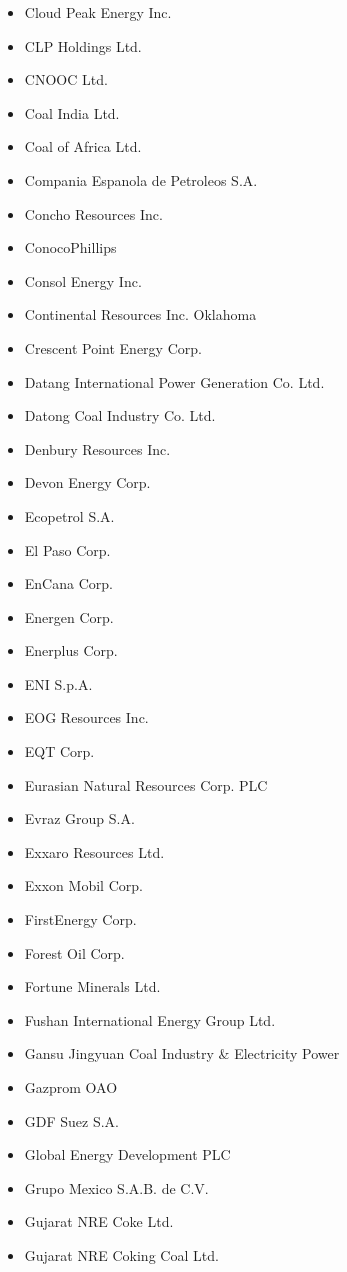 \documentclass[10pt]{article}
\begin{document}
\begin{itemize}
  \item Cloud Peak Energy Inc.
  \item CLP Holdings Ltd.
  \item CNOOC Ltd.
  \item Coal India Ltd.
  \item Coal of Africa Ltd.
  \item Compania Espanola de Petroleos S.A.
  \item Concho Resources Inc.
  \item ConocoPhillips
  \item Consol Energy Inc.
  \item Continental Resources Inc. Oklahoma
  \item Crescent Point Energy Corp.
  \item Datang International Power Generation Co. Ltd.
  \item Datong Coal Industry Co. Ltd.
  \item Denbury Resources Inc.
  \item Devon Energy Corp.
  \item Ecopetrol S.A.
  \item El Paso Corp.
  \item EnCana Corp.
  \item Energen Corp.
  \item Enerplus Corp.
  \item ENI S.p.A.
  \item EOG Resources Inc.
  \item EQT Corp.
  \item Eurasian Natural Resources Corp. PLC
  \item Evraz Group S.A.
  \item Exxaro Resources Ltd.
  \item Exxon Mobil Corp.
  \item FirstEnergy Corp.
  \item Forest Oil Corp.
  \item Fortune Minerals Ltd.
  \item Fushan International Energy Group Ltd.
  \item Gansu Jingyuan Coal Industry \& Electricity Power 
  \item Gazprom OAO
  \item GDF Suez S.A.
  \item Global Energy Development PLC
  \item Grupo Mexico S.A.B. de C.V.
  \item Gujarat NRE Coke Ltd.
  \item Gujarat NRE Coking Coal Ltd.

\end{itemize}
\end{document}
